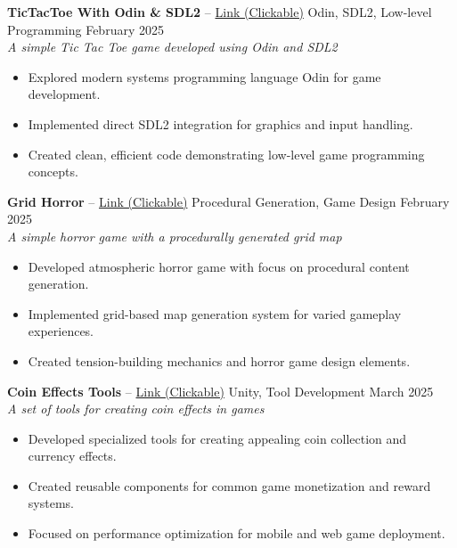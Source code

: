 \documentclass[a4paper,10pt]{article}
\begin{document}
\addvspace{\medskipamount} %

\textbf{TicTacToe With Odin \& SDL2} -- \href{https://assayyaad.itch.io/xo}{Link (Clickable)} \hfill Odin, SDL2, Low-level Programming \hfill February 2025 \\
\textit{A simple Tic Tac Toe game developed using Odin and SDL2}
\begin{itemize}[nosep]
    \item Explored modern systems programming language Odin for game development.
    \item Implemented direct SDL2 integration for graphics and input handling.
    \item Created clean, efficient code demonstrating low-level game programming concepts.
\end{itemize}

\addvspace{\medskipamount} %

\textbf{Grid Horror} -- \href{https://assayyaad.itch.io/grid-horror}{Link (Clickable)} \hfill Procedural Generation, Game Design \hfill February 2025 \\
\textit{A simple horror game with a procedurally generated grid map}
\begin{itemize}[nosep]
    \item Developed atmospheric horror game with focus on procedural content generation.
    \item Implemented grid-based map generation system for varied gameplay experiences.
    \item Created tension-building mechanics and horror game design elements.
\end{itemize}

\addvspace{\medskipamount} %

\textbf{Coin Effects Tools} -- \href{https://assayyaad.itch.io/riyal-coin}{Link (Clickable)} \hfill Unity, Tool Development \hfill March 2025 \\
\textit{A set of tools for creating coin effects in games}
\begin{itemize}[nosep]
    \item Developed specialized tools for creating appealing coin collection and currency effects.
    \item Created reusable components for common game monetization and reward systems.
    \item Focused on performance optimization for mobile and web game deployment.
\end{itemize}
\end{document}
